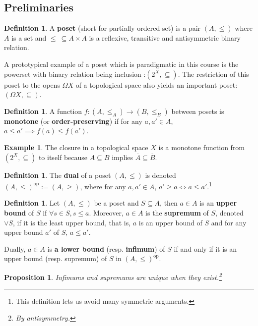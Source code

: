 \documentclass{tufte-handout} %
\newtheorem{prop}[thm]{Proposition}
\theoremstyle{definition}
\newtheorem{defn}[thm]{Definition}
\newtheorem{exmp}[thm]{Example}
\theoremstyle{remark}
\newcommand{\op}[1]{#1^{\text{op}}}
\newcommand{\0}{\textsf{0}}
\newcommand{\1}{\textsf{1}}
\begin{document}
\subsection{Preliminaries}
\begin{defn}
	A \textbf{poset} (short for partially ordered set) is a pair $(A, \leq)$ where $A$ is a set and $\leq\ \subseteq A \times A$ is a reflexive, transitive and antisymmetric binary relation.
\end{defn}
A prototypical example of a poset which is paradigmatic in this course is the powerset with binary relation being inclusion :$(2^X, \subseteq)$. The restriction of this poset to the opens $\Omega X$ of a topological space also yields an important poset: $(\Omega X, \subseteq)$.
\begin{defn}
	A function $f:(A, \leq_A) \rightarrow (B,\leq_B)$ between posets is \textbf{monotone} (or \textbf{order-preserving}) if for any $a, a' \in A$, $a \leq a' \implies f(a) \leq f(a')$.
\end{defn}
\begin{exmp}
	The closure in a topological space $X$ is a monotone function from $(2^X, \subseteq)$ to itself because $A\subseteq B$ implies $\overline{A} \subseteq \overline{B}$.
\end{exmp}
\begin{defn}
	The \textbf{dual} of a poset $(A, \leq)$ is denoted $\op{(A, \leq)} := (A, \geq)$, where for any $a,a' \in A$, $a' \geq a \Leftrightarrow a\leq a'$.\footnote{This definition lets us avoid many symmetric arguments.}%
\end{defn}
\begin{defn}
	Let $(A, \leq)$ be a poset and $S \subseteq A$, then $a \in A$ is an \textbf{upper bound} of $S$ if $\forall s \in S, s\leq a$. Moreover, $a \in A$ is the \textbf{supremum} of $S$, denoted $\vee S$, if it is the least upper bound, that is, $a$ is an upper bound of $S$ and for any upper bound $a'$ of $S$, $a\leq a'$.
	
	Dually, $a \in A$ is \textbf{a lower bound} (resp. \textbf{infimum}) of $S$ if and only if it is an upper bound (resp. supremum) of $S$ in $\op{(A, \leq)}$.
\end{defn}
\begin{prop}
	Infimums and supremums are unique when they exist.\footnote{By antisymmetry.}
\end{prop}
\end{document}

